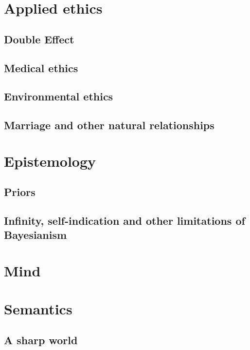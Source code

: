 
\def\mychapter{III}
\chapter{Applied ethics}\label{ch:applied-ethics}
\section{Double Effect}
\section{Medical ethics}
\section{Environmental ethics}
\section{Marriage and other natural relationships}
\chaptertail

\def\mychapter{IV}

\chapter{Epistemology}\label{ch:epistemology}
\section{Priors}
\section{Infinity, self-indication and other limitations of Bayesianism}
\chaptertail 

\def\mychapter{V}

\chapter{Mind}\label{ch:mind}
\chaptertail 

\def\mychapter{VI}

\chapter{Semantics}\label{ch:semantics}
\section{A sharp world}
\chaptertail

\def\mychapter{VII}

